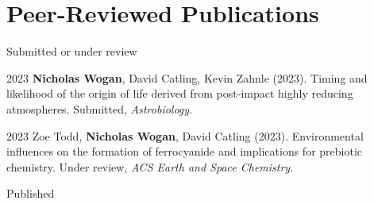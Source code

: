 \documentclass{article}
\begin{document}
\section{Peer-Reviewed Publications}

\noindent Submitted or under review

\begin{cvlist}
\item[2023]
  \textbf{Nicholas Wogan}, David Catling, Kevin Zahnle (2023). Timing and likelihood of the origin of life derived from post-impact highly    reducing atmospheres. Submitted, \emph{Astrobiology}.
\item[2023]
  Zoe Todd, \textbf{Nicholas Wogan}, David Catling (2023). Environmental influences on the formation of ferrocyanide and implications for prebiotic chemistry. Under review, \emph{ACS Earth and Space Chemistry}.
\end{cvlist}

\noindent Published
\end{document}
